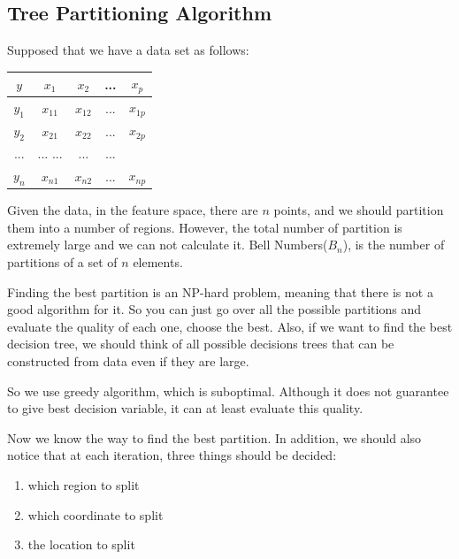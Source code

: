 \documentclass{article}
\begin{document}
{\subsection{Tree Partitioning Algorithm}
 Supposed that we have a data set as follows:
	
     \begin{center}{
	 		\begin{tabular}{c|c c c c }
	 			
	 			$y$ & $x_1$ & $x_2$ & ... & $x_p$ \\
	 			\hline
	 			$y_1$ & $x_{11}$ & $x_{12}$ & ... & $x_{1p}$ \\
	 			
	 			$y_2$ & $x_{21}$ & $x_{22}$ & ... & $x_{2p}$ \\
	 			
	 			... & ...  ... & ... & ... \\
	 			
	 			$y_n$ & $x_{n1}$ & $x_{n2}$ & ... & $x_{np}$ \\
	 			
	 		\end{tabular}
	 	}
	 \end{center}
	 
	 Given the data, in the feature space, there are $n$ points, and we should partition them into a number of regions. However, the total number of partition is extremely large and we can not calculate it. Bell Numbers($B_n$), is the number of partitions of a set of $n$ elements. 
	 
	 Finding the best partition is an NP-hard problem, meaning that there is not a good algorithm for it. So you can just go over all the possible partitions and evaluate the quality of each one, choose the best. Also, if we want to find the best decision tree, we should think of all possible decisions trees that can be constructed from data even if they are large.
	 
	 So we use greedy algorithm, which is suboptimal.  Although it does not guarantee to give best decision variable, it can at least evaluate this quality.
	 
	 Now we know the way to find the best partition. In addition, we should also notice that at each iteration, three things should be decided:
	 
	 \begin{enumerate}
	 	\item which region to split
	 	\item which coordinate to split
	 	\item the location to split
	 \end{enumerate}


}
\end{document}
